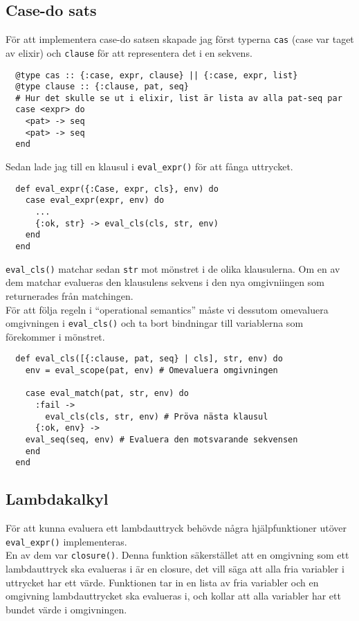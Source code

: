 \documentclass[a4paper,11pt]{article}
\begin{document}
\subsection*{Case-do sats}
För att implementera case-do satsen skapade jag först typerna {\tt cas} (case var taget av elixir) och {\tt clause} för att representera det i en sekvens.
\begin{verbatim}
  @type cas :: {:case, expr, clause} || {:case, expr, list}
  @type clause :: {:clause, pat, seq}
  # Hur det skulle se ut i elixir, list är lista av alla pat-seq par
  case <expr> do
    <pat> -> seq
    <pat> -> seq
  end
\end{verbatim}
Sedan lade jag till en klausul i {\tt eval\_expr()} för att fånga uttrycket.
\begin{verbatim}
  def eval_expr({:Case, expr, cls}, env) do
    case eval_expr(expr, env) do
      ...
      {:ok, str} -> eval_cls(cls, str, env)
    end
  end
\end{verbatim}
{\tt eval\_cls()} matchar sedan {\tt str} mot mönstret i de olika klausulerna. Om en av dem matchar evalueras den klausulens sekvens i den nya omgivniingen som returnerades från matchingen.\\
För att följa regeln i ``operational semantics'' måste vi dessutom omevaluera omgivningen i {\tt eval\_cls()} och ta bort bindningar till variablerna som förekommer i mönstret.
\begin{verbatim}
  def eval_cls([{:clause, pat, seq} | cls], str, env) do
    env = eval_scope(pat, env) # Omevaluera omgivningen
    
    case eval_match(pat, str, env) do
      :fail ->
        eval_cls(cls, str, env) # Pröva nästa klausul
      {:ok, env} ->
	eval_seq(seq, env) # Evaluera den motsvarande sekvensen
    end
  end
\end{verbatim}

\subsection*{Lambdakalkyl}
För att kunna evaluera ett lambdauttryck behövde några hjälpfunktioner utöver {\tt eval\_expr()} implementeras.\\
En av dem var {\tt closure()}. Denna funktion säkerstället att en omgivning som ett lambdauttryck ska evalueras i är en closure, det vill säga att alla fria variabler i uttrycket har ett värde. Funktionen tar in en lista av fria variabler och en omgivning lambdauttrycket ska evalueras i, och kollar att alla variabler har ett bundet värde i omgivningen.
\end{document}
